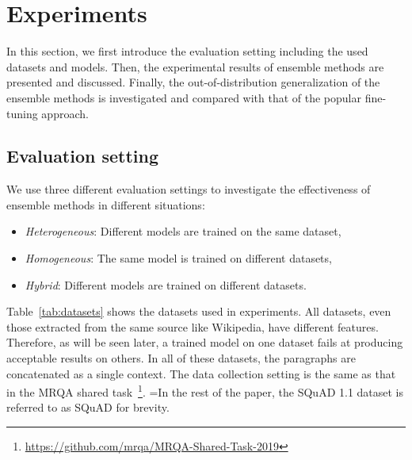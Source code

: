 \documentclass[review]{elsarticle}
\begin{document}
\section{Experiments}
In this section, we first introduce the evaluation setting including the used datasets and models. Then, the experimental results of ensemble methods are presented and discussed. Finally, the out-of-distribution generalization of the ensemble methods is investigated and compared with that of the popular fine-tuning approach.

\subsection{Evaluation setting}
We use three different evaluation settings to investigate the effectiveness of ensemble methods in different situations:
\begin{itemize}
    \item \textit{Heterogeneous}: Different models are trained on the same dataset,
    \item \textit{Homogeneous}: The same model is trained on different datasets, 
    \item \textit{Hybrid}: Different models are trained on different datasets.
\end{itemize}

 Table~\ref{tab:datasets} shows the datasets used in experiments. All datasets, even those extracted from the same source like Wikipedia, have different features. Therefore, as will be seen later, a trained model on one dataset fails at producing acceptable results on others. In all of these datasets, the paragraphs are concatenated as a single context. The data collection setting is the same as that in the MRQA shared task~\citep{RN230}\footnote{\url{https://github.com/mrqa/MRQA-Shared-Task-2019}}. =In the rest of the paper, the SQuAD 1.1 dataset is referred to as SQuAD for brevity.
\end{document}
